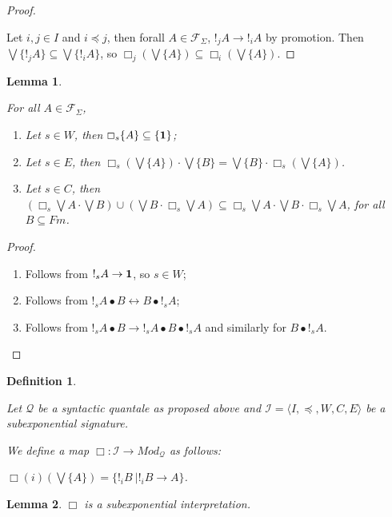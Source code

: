 \documentclass[a4paper]{article}
\theoremstyle{defin}
\newtheorem{defin}{Definition}
\theoremstyle{theorem}
\theoremstyle{prop}
\theoremstyle{lemma}
\newtheorem{lemma}{Lemma}
\theoremstyle{ex}
\theoremstyle{col}
\begin{document}
\begin{proof}
$ $

  Let $i, j \in I$ and $i \preceq j$, then forall $A \in \mathcal{F}_{\Sigma}$, $!_j A \rightarrow !_i A$ by promotion.
  Then $\bigvee \{ !_j A \} \subseteq \bigvee \{ !_i A \}$, so $\Box_j (\bigvee \{ A \}) \subseteq \Box_i (\bigvee \{ A \})$.
\end{proof}

\begin{lemma}
$ $

For all $A \in \mathcal{F}_{\Sigma}$,
  \begin{enumerate}
    \item Let $s \in W$, then $\Box_s \{ A \} \subseteq \{ {\bf 1} \}$;
    \item Let $s \in E$, then $\Box_s (\bigvee \{ A \}) \cdot \bigvee \{ B \} = \bigvee \{ B\} \cdot \Box_s (\bigvee \{ A \})$.
    \item Let $s \in C$, then $(\Box_s \bigvee A \cdot \bigvee B) \cup (\bigvee B \cdot \Box_s \bigvee A) \subseteq \Box_s \bigvee A \cdot \bigvee B \cdot \Box_s \bigvee A$, for all $B \subseteq Fm$.
  \end{enumerate}
\end{lemma}

\begin{proof}
$ $

\begin{enumerate}
  \item Follows from $!_s A \rightarrow {\bf 1}$, so $s \in W$;
  \item Follows from $!_s A \bullet B \leftrightarrow B \bullet !_s A$;
  \item Follows from $!_s A \bullet B \rightarrow !_s A \bullet B \bullet !_s A$ and similarly for $B \bullet !_s A$.
\end{enumerate}
\end{proof}

\begin{defin}
$ $

Let $\mathcal{Q}$ be a syntactic quantale as proposed above and
$\mathcal{I} = \langle I, \preceq, W, C, E \rangle$ be a subexponential signature.

We define a map $\Box : \mathcal{I} \to Mod_{\mathcal{Q}}$ as follows:

$\Box(i)(\bigvee \{ A \} ) = \{ !_i B \: | !_i B \rightarrow A \}$.
\end{defin}

\begin{lemma} $\Box$ is a subexponential interpretation.
\end{lemma}
\end{document}

